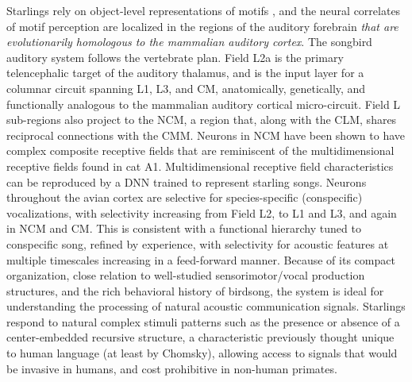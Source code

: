 Starlings rely on object-level representations of motifs \cite{Meliza2010,gentner1998perceptual,Comins2013,comins2014auditory}, and the neural correlates of motif perception are localized in the regions of the auditory forebrain \emph{that are evolutionarily homologous to the mammalian auditory cortex\cite{wang2010laminar}}. The songbird auditory system follows the vertebrate plan\cite{Carr1992}. Field L2a is the primary telencephalic target of the auditory thalamus\cite{Karten1968}, and is the input layer for a columnar circuit spanning L1, L3, and \ac{CM}, anatomically\cite{Wang2010a,Jarvis2005}, genetically\cite{Dugas-Ford2012}, and functionally\cite{Calabrese2015} analogous to the mammalian auditory cortical micro-circuit. Field L sub-regions also project to the \ac{NCM}, a region that, along with the \ac{CLM}, shares reciprocal connections with the \ac{CMM}. Neurons in \ac{NCM} have been shown to have complex composite receptive fields\cite{kozlov2016central} that are reminiscent of the multidimensional receptive fields found in cat A1\cite{atencio2008cooperative}. Multidimensional receptive field characteristics can be reproduced by a \ac{DNN}\cite{kozlov2016central} trained to represent starling songs. Neurons throughout the avian cortex are selective for species-specific (conspecific) vocalizations\cite{Bonke1979,Leppelsack1976,Muller1985}, with selectivity increasing from Field L2, to L1 and L3\cite{Theunissen2004,Theunissen1998,Theunissen2000}, and again in \ac{NCM} and \ac{CM}\cite{Calabrese2015,Muller1985,Grace2003,Bonke1979,Leppelsack1976,gentner2003neuronal,Gentner2004,Thompson2010,Jeanne2011}. This is consistent with a functional hierarchy tuned to conspecific song\cite{Hsu2004,Woolley2005}, refined by experience\cite{gentner2003neuronal,Sockman2002,Sockman2005,Phan2006,Thompson2010,Jeanne2011}, with selectivity for acoustic features at multiple timescales increasing in a feed-forward manner\cite{Rose1988,Kaas2000,Binder2000,VanEssen1992}. Because of its compact organization, close relation to well-studied sensorimotor/vocal production structures, and the rich behavioral history of birdsong, the system is ideal for understanding the processing of natural acoustic communication signals.
Starlings respond to natural complex stimuli patterns such as the presence or absence of a center-embedded recursive structure\cite{gentner2006recursive,comins2014auditory,comins2014temporal}, a characteristic previously thought unique to human language (at least by Chomsky), allowing access to signals that would be invasive in humans, and cost prohibitive in non-human primates.

